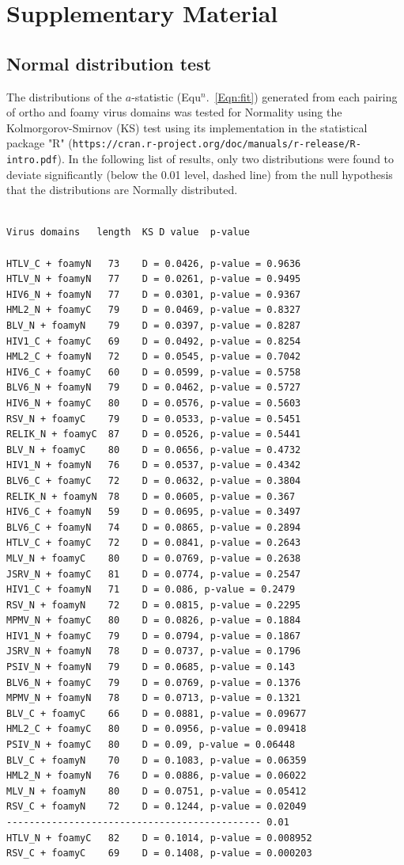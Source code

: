 \documentclass{bmcart}
\newcommand{\Eqn}[1]{Equ$^n$.~\ref{Eqn:#1}}
\begin{document}
\clearpage
\section*{Supplementary Material}

\subsection*{Normal distribution test}

The distributions of the $a$-statistic (\Eqn{fit}) generated from each pairing of ortho and foamy
virus domains was tested for Normality using the Kolmorgorov-Smirnov (KS) test using its implementation
in the statistical package "R" ({\tt https://cran.r-project.org/doc/manuals/r-release/R-intro.pdf}).
In the following list of results, only two distributions were found to deviate significantly (below
the 0.01 level, dashed line) from the null hypothesis that the distributions are Normally distributed.

\begin{verbatim}

Virus domains   length  KS D value  p-value

HTLV_C + foamyN   73	D = 0.0426, p-value = 0.9636
HTLV_N + foamyN   77	D = 0.0261, p-value = 0.9495
HIV6_N + foamyN   77	D = 0.0301, p-value = 0.9367
HML2_N + foamyC   79	D = 0.0469, p-value = 0.8327
BLV_N + foamyN    79	D = 0.0397, p-value = 0.8287
HIV1_C + foamyC   69	D = 0.0492, p-value = 0.8254
HML2_C + foamyN   72	D = 0.0545, p-value = 0.7042
HIV6_C + foamyC   60	D = 0.0599, p-value = 0.5758
BLV6_N + foamyN   79	D = 0.0462, p-value = 0.5727
HIV6_N + foamyC   80	D = 0.0576, p-value = 0.5603
RSV_N + foamyC    79	D = 0.0533, p-value = 0.5451
RELIK_N + foamyC  87	D = 0.0526, p-value = 0.5441
BLV_N + foamyC    80	D = 0.0656, p-value = 0.4732
HIV1_N + foamyN   76	D = 0.0537, p-value = 0.4342
BLV6_C + foamyC   72	D = 0.0632, p-value = 0.3804
RELIK_N + foamyN  78	D = 0.0605, p-value = 0.367
HIV6_C + foamyN   59	D = 0.0695, p-value = 0.3497
BLV6_C + foamyN   74	D = 0.0865, p-value = 0.2894
HTLV_C + foamyC   72	D = 0.0841, p-value = 0.2643
MLV_N + foamyC    80	D = 0.0769, p-value = 0.2638
JSRV_N + foamyC   81	D = 0.0774, p-value = 0.2547
HIV1_C + foamyN   71	D = 0.086, p-value = 0.2479
RSV_N + foamyN    72	D = 0.0815, p-value = 0.2295
MPMV_N + foamyC   80	D = 0.0826, p-value = 0.1884
HIV1_N + foamyC   79	D = 0.0794, p-value = 0.1867
JSRV_N + foamyN   78	D = 0.0737, p-value = 0.1796
PSIV_N + foamyN   79	D = 0.0685, p-value = 0.143
BLV6_N + foamyC   79	D = 0.0769, p-value = 0.1376
MPMV_N + foamyN   78	D = 0.0713, p-value = 0.1321
BLV_C + foamyC    66	D = 0.0881, p-value = 0.09677
HML2_C + foamyC   80	D = 0.0956, p-value = 0.09418
PSIV_N + foamyC   80	D = 0.09, p-value = 0.06448
BLV_C + foamyN    70	D = 0.1083, p-value = 0.06359
HML2_N + foamyN   76	D = 0.0886, p-value = 0.06022
MLV_N + foamyN    80	D = 0.0751, p-value = 0.05412
RSV_C + foamyN    72	D = 0.1244, p-value = 0.02049
--------------------------------------------- 0.01
HTLV_N + foamyC   82	D = 0.1014, p-value = 0.008952
RSV_C + foamyC    69	D = 0.1408, p-value = 0.000203
\end{verbatim}
\end{document}
